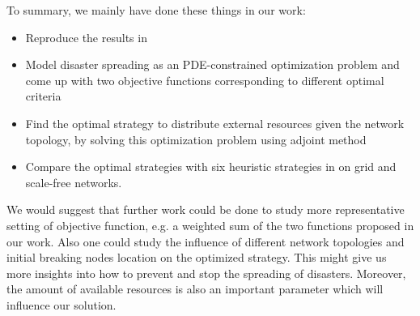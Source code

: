 To summary, we mainly have done these things in our work:
\begin{itemize}
	\item Reproduce the results in \cite{buzna2007efficient}
	\item Model disaster spreading as an PDE-constrained optimization problem and come up with two objective functions corresponding to different optimal criteria
	\item Find the optimal strategy to distribute external resources given the network topology, by solving this optimization problem using adjoint method
	\item Compare the optimal strategies with six heuristic strategies in \cite{buzna2007efficient} on grid and scale-free networks. 
\end{itemize}

We would suggest that further work could be done to study more representative setting of objective function,  e.g. a weighted sum of the two functions proposed in our work. Also one could study the influence of different network topologies and initial breaking nodes location on the optimized strategy. This might give us more insights into how to prevent and stop the spreading of disasters. Moreover, the amount of available resources is also an important parameter which will influence our solution.
